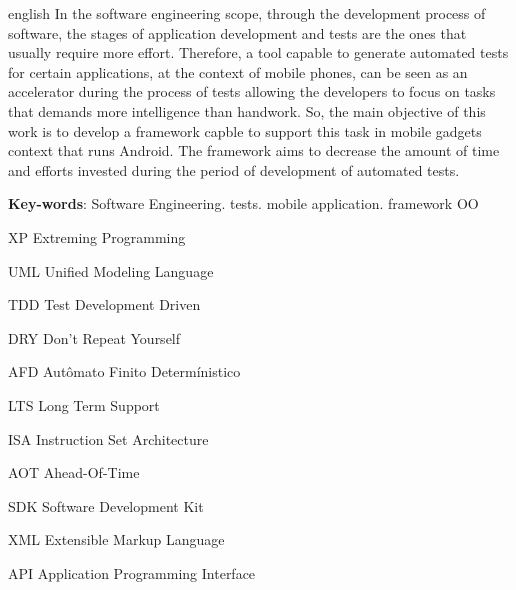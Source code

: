 \documentclass[
    12pt,       %
    openright,      %
    twoside,      %
    a4paper,      %
    english,      %
    french,       %
    spanish,      %
    brazil,       %
    ]{abntex2}
\begin{document}
  \begin{resumo}[Abstract]
   \begin{otherlanguage*}{english}
     In the software engineering scope, through the development process of
     software, the stages of application development and tests are the
     ones that usually require more effort. Therefore, a tool capable to generate
     automated tests for certain applications, at the context of mobile
     phones, can be seen as an accelerator during the process of
     tests allowing the developers to focus on tasks that demands
     more intelligence than handwork. So, the main objective of this work
     is to develop a framework capble to support this task in mobile
     gadgets context that runs Android. The framework aims to decrease the amount of
     time and efforts invested during the period of development of automated tests.

     \vspace{\onelineskip}

     \noindent
     \textbf{Key-words}: Software Engineering. tests. mobile application. framework OO
   \end{otherlanguage*}
  \end{resumo}

  \listoffigures*
  \cleardoublepage

  \listoftables*
  \cleardoublepage

  \begin{siglas}
    \item[XP] Extreming Programming
    \item[UML] Unified Modeling Language
    \item[TDD] Test Development Driven
    \item[DRY] Don't Repeat Yourself
    \item[AFD] Autômato Finito Determínistico
    \item[LTS] Long Term Support
    \item[ISA] Instruction Set Architecture
    \item[AOT] Ahead-Of-Time
    \item[SDK] Software Development Kit
    \item[XML] Extensible Markup Language
    \item[API] Application Programming Interface
  \end{siglas}
\end{document}
